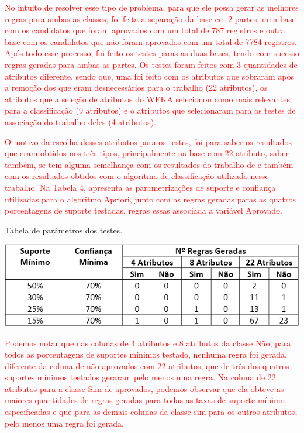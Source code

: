 \par
\textcolor{red}{No intuito de resolver esse tipo de problema, para que ele possa gerar as melhores regras para ambas as classes, foi feita a separação da base em 2 partes, uma base com os candidatos que foram aprovados com um total de 787 registros e outra base com os candidatos que não foram aprovados com um total de 7784 registros. Após todo esse processo, foi feito os testes paras as duas bases, tendo com sucesso regras geradas para ambas as partes. Os testes foram feitos com 3 quantidades de atributos diferente, sendo que, uma foi feito com os atributos que sobraram após a remoção dos que eram desnecessários para o trabalho (22 atributos), os atributos que a seleção de atributos do WEKA selecionou como mais relevantes para a classificação (9 atributos) e o atributos que  selecionaram para os testes de associação do trabalho deles (4 atributos).}

\par
\textcolor{red}{O motivo da escolha desses atributos para os testes, foi para saber os resultados que eram obtidos nos três tipos, principalmente na base com 22 atributo, saber também, se tem alguma semelhança com os resultados do trabalho de  e também com os resultados obtidos com o algoritmo de classificação utilizado nesse trabalho. Na Tabela 4, apresenta as parametrizações de suporte e confiança utilizadas para o algoritmo Apriori, junto com as regras geradas paras as quatros porcentagens de suporte testadas, regras essas associada a variável Aprovado.}


\par
\begin{table}[!htp]
	\begin{center}
    \caption{\label{fig:waveform_fig} Tabela de parâmetros dos testes.}
	\includegraphics[scale=0.90]{Figuras/Tabela_de_parametros_apriori.png}
	\end{center}
\end{table}

\par
\textcolor{red}{Podemos notar que nas colunas de 4 atributos e 8 atributos da classe Não, para todos as porcentagens de suportes mínimos testado, nenhuma regra foi gerada, diferente da coluna de não aprovados com 22 atributos, que de três dos quatros suportes mínimos testados geraram pelo menos uma regra. Na coluna de 22 atributos para a classe Sim de aprovados, podemos observar que ela obteve as maiores quantidades de regras geradas para todas as taxas de suporte mínimo especificadas e que para as demais colunas da classe sim para os outros atributos, pelo menos uma regra foi gerada.}

